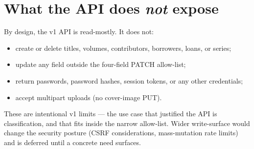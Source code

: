 \section{What the API does \emph{not} expose}

By design, the v1 API is read-mostly. It does not:

\begin{itemize}
  \item create or delete titles, volumes, contributors, borrowers,
        loans, or series;
  \item update any field outside the four-field PATCH allow-list;
  \item return passwords, password hashes, session tokens, or any
        other credentials;
  \item accept multipart uploads (no cover-image PUT).
\end{itemize}

These are intentional v1 limits — the use case that justified the
API is classification, and that fits inside the narrow allow-list.
Wider write-surface would change the security posture (CSRF
considerations, mass-mutation rate limits) and is deferred until a
concrete need surfaces.
